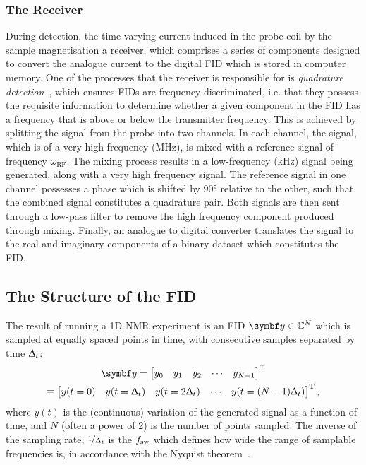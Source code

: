 \subsubsection{The Receiver}
During detection, the time-varying current induced in the probe coil by
the sample magnetisation  a receiver,
which comprises a series of components designed to convert the
analogue current to the digital \ac{FID} which is stored in computer memory.
One of the processes that the receiver is responsible for is \emph{quadrature
detection}~\cite[Section 13.6]{Keeler2010}, which ensures
\acp{FID} are frequency discriminated, i.e. that they possess the requisite
information to determine whether a given component in the \ac{FID} has a
frequency that is above or below the transmitter frequency.
This is achieved by splitting the signal from the probe into two channels. In
each channel, the signal, which is of a very high frequency
(\unit{\mega\hertz}), is mixed with a reference signal of frequency
$\omega_{\text{RF}}$. The mixing process results in a low-frequency
(\unit{\kilo\hertz}) signal being generated, along with a very high frequency
signal. The reference signal in one channel possesses a phase which
is shifted by \ang{90} relative to the other, such that the combined signal
constitutes a quadrature pair.
Both signals are then sent through a low-pass filter to remove
the high frequency component produced through mixing. Finally, an analogue to
digital converter translates the signal to the real and imaginary components of
a binary dataset which constitutes the \ac{FID}.

\subsection{The Structure of the \acs{FID}}
The result of running a \ac{1D} \ac{NMR} experiment is an \ac{FID} $\by \in
\mathbb{C}^N$ which is sampled at equally spaced points in time, with
consecutive samples separated by time $\Updelta_t$:
\begin{equation}
    \begin{gathered}
        \by = \begin{bmatrix}
            y_0 & y_1 & y_2 & \cdots & y_{N-1}
      \end{bmatrix}\T\\
      \equiv
      \begin{bmatrix}
          y(t=0) & y(t=\Dt) & y(t=2\Dt) & \cdots & y(t=(N-1)\Dt)
      \end{bmatrix}\T,
    \end{gathered}
\end{equation}
where $y(t)$ is the (continuous) variation of the generated signal as a
function of time,
and $N$ (often a power of 2) is the number of points sampled. The inverse of
the sampling rate,
$\nicefrac{1}{\Updelta_t}$ is the  $f_{\mathrm{sw}}$ which
defines how wide the range of samplable frequencies is, in accordance with the
Nyquist theorem~\cite{Shannon1949}.

